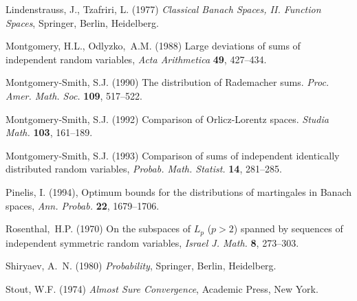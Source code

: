\documentclass[12pt]{article}
\begin{document}
\begin{thebibliography}{99}
 Lindenstrauss, J., Tzafriri, L. (1977) {\em Classical Banach
Spaces,
II. Function Spaces}, Springer, Berlin,
Heidelberg.

  Montgomery,
H.L., Odlyzko,~A.M. (1988) Large deviations of sums of independent
random variables, {\em Acta Arithmetica} {\bf 49}, 427--434.

Montgomery-Smith, S.J. (1990) The distribution of Rademacher sums. 
{\em Proc. Amer. Math. Soc.} {\bf 109}, 517--522.

Montgomery-Smith, S.J. (1992)
Comparison of Orlicz-Lorentz spaces. 
{\em Studia Math.} {\bf 103}, 161--189.

 Montgomery-Smith, S.J. (1993) Comparison of sums of independent
identically distributed random variables, {\em Probab. Math. Statist.}
{\bf 14}, 281--285.

 Pinelis, I. (1994),
Optimum bounds for the distributions of martingales in Banach spaces,
{\em Ann. Probab.} {\bf 22}, 1679--1706.

 Rosenthal,~H.P. (1970) On the subspaces of $L_p$ 
($p > 2$) spanned by
sequences of independent symmetric random variables, {\em Israel
J. Math.} {\bf 8}, 273--303.

 Shiryaev, A.~N. (1980)
{\em Probability}, Springer, Berlin, 
 Heidelberg.

 Stout, W.F. (1974) {\em
Almost Sure Convergence}, Academic Press, New York.

\end{thebibliography}
\end{document}
